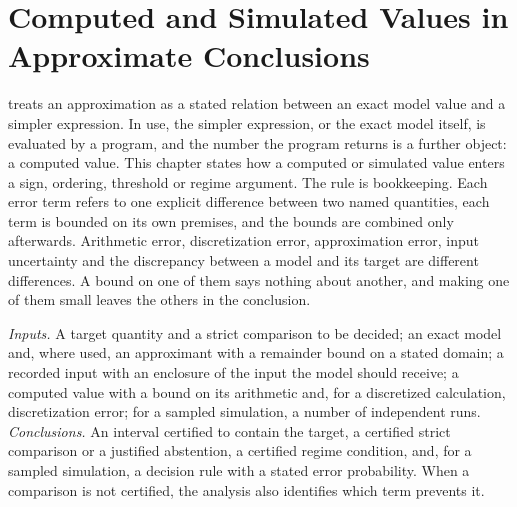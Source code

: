 \chapter{Computed and Simulated Values in Approximate Conclusions}
\label{sec:p15-w02b-p15-074}

 treats an approximation
as a stated relation between an exact model value and a simpler expression.
In use, the simpler expression, or the exact model itself, is evaluated by
a program, and the number the program returns is a further object: a
computed value. This chapter states how a computed or simulated value enters
a sign, ordering, threshold or regime argument. The rule is bookkeeping.
Each error term refers to one explicit difference between two named
quantities, each term is bounded on its own premises, and the bounds are
combined only afterwards. Arithmetic error, discretization error,
approximation error, input uncertainty and the discrepancy between a model
and its target are different differences. A bound on one of them says
nothing about another, and making one of them small leaves the others in
the conclusion.

\emph{Inputs.} A target quantity and a strict comparison to be decided;
an exact model and, where used, an approximant with a remainder bound on a
stated domain; a recorded input with an enclosure of the input the model
should receive; a computed value with a bound on its arithmetic and, for a
discretized calculation, discretization error; for a sampled simulation, a
number of independent runs. \emph{Conclusions.} An interval certified to
contain the target, a certified strict comparison or a justified abstention,
a certified regime condition, and, for a sampled simulation, a decision
rule with a stated error probability. When a comparison is not certified,
the analysis also identifies which term prevents it.

